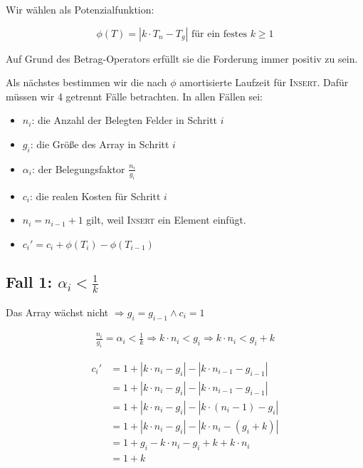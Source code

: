 \documentclass[parskip=half,a4paper]{scrartcl}
\begin{document}
Wir wählen als Potenzialfunktion:

\begin{equation}
    \phi(T) = \left|k \cdot T_n - T_g\right| \text{ für ein festes $k \ge 1$}
\end{equation}

Auf Grund des Betrag-Operators erfüllt sie die Forderung immer positiv zu sein.

Als nächstes bestimmen wir die nach $\phi$ amortisierte Laufzeit für \textsc{Insert}. Dafür müssen wir 4 getrennt Fälle betrachten. In allen Fällen sei:

\begin{itemize}
    \item $n_i$: die Anzahl der Belegten Felder in Schritt $i$
    \item $g_i$: die Größe des Array in Schritt $i$
    \item $\alpha_i$: der Belegungsfaktor $\frac{n_i}{g_i}$
    \item $c_i$: die realen Kosten für Schritt $i$
    \item $n_i = n_{i-1} + 1$ gilt, weil \textsc{Insert} ein Element einfügt.
    \item $c_i' = c_i + \phi(T_i) - \phi(T_{i-1})$
\end{itemize}

\subsection*{Fall 1: $\alpha_i < \frac{1}{k}$}

Das Array wächst nicht
$\Rightarrow g_i = g_{i-1} \land c_i = 1$

\begin{equation}
\begin{aligned}
\frac{n_i}{g_i} = \alpha_i < \frac{1}{k}
\Rightarrow k \cdot n_i < g_i
\Rightarrow  k \cdot n_i < g_i + k
\end{aligned}
\end{equation}

\begin{equation}
\begin{aligned}
   c_i' &= 1 + \left|k \cdot n_i - g_i\right| - \left|k \cdot n_{i-1} - g_{i-1}\right|\\
   &= 1 + \left|k \cdot n_i - g_i\right| - \left|k \cdot n_{i-1} - g_{i-1}\right|\\
   &= 1 + \left|k \cdot n_i - g_i\right| - \left|k \cdot  (n_{i}-1) - g_{i}\right|\\
   &= 1 + \left|k \cdot n_i - g_i\right| - \left|k \cdot n_{i} - (g_{i} + k)\right|\\
   &= 1 + g_i - k \cdot n_i - g_i + k + k \cdot n_i\\
   &= 1 + k
\end{aligned}
\end{equation}
\end{document}
